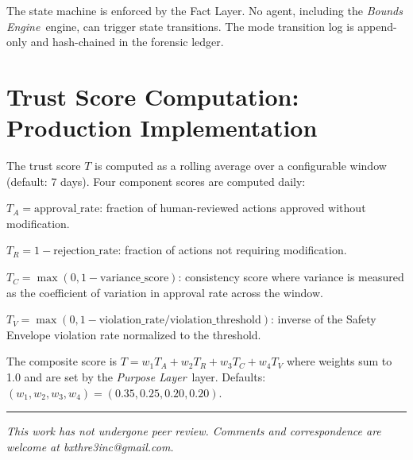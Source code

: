 \documentclass[12pt]{article}
\newcommand{\purpose}{\textit{Purpose Layer}}
\newcommand{\bounds}{\textit{Bounds Engine}}
\begin{document}
The state machine is enforced by the Fact Layer. No agent, including the \bounds\ engine, can trigger state transitions. The mode transition log is append-only and hash-chained in the forensic ledger.

\section{Trust Score Computation: Production Implementation}
\label{sec:trust-score-impl}

The trust score $T$ is computed as a rolling average over a configurable window (default: 7 days). Four component scores are computed daily:

$T_A = \text{approval\_rate}$: fraction of human-reviewed actions approved without modification.

$T_R = 1 - \text{rejection\_rate}$: fraction of actions not requiring modification.

$T_C = \max(0, 1 - \text{variance\_score})$: consistency score where variance is measured as the coefficient of variation in approval rate across the window.

$T_V = \max(0, 1 - \text{violation\_rate} / \text{violation\_threshold})$: inverse of the Safety Envelope violation rate normalized to the threshold.

The composite score is $T = w_1 T_A + w_2 T_R + w_3 T_C + w_4 T_V$ where weights sum to 1.0 and are set by the \purpose\ layer. Defaults: $(w_1, w_2, w_3, w_4) = (0.35, 0.25, 0.20, 0.20)$.





\vspace{2em}
\hrule
\vspace{0.5em}
\noindent\small\textit{This work has not undergone peer review. Comments and correspondence are welcome at bxthre3inc@gmail.com.}
\end{document}
